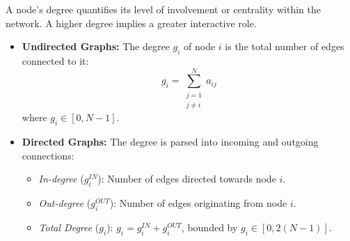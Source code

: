 \documentclass[10pt, letterpaper]{report}
\begin{document}
A node's degree quantifies its level of involvement or centrality within the network. A higher degree implies a greater interactive role.
\begin{itemize}
    \item \textbf{Undirected Graphs:} The degree $g_i$ of node $i$ is the total number of edges connected to it:
    \begin{equation}
        g_i = \sum_{\substack{j=1 \\ j \neq i}}^{N} a_{ij}
    \end{equation}
    where $g_i \in [0, N-1]$.
    \item \textbf{Directed Graphs:} The degree is parsed into incoming and outgoing connections:
    \begin{itemize}
        \item \textit{In-degree} ($g_i^{IN}$): Number of edges directed towards node $i$.
        \item \textit{Out-degree} ($g_i^{OUT}$): Number of edges originating from node $i$.
        \item \textit{Total Degree} ($g_i$): $g_i = g_i^{IN} + g_i^{OUT}$, bounded by $g_i \in [0, 2(N-1)]$.
    \end{itemize}
\end{itemize}
\end{document}
